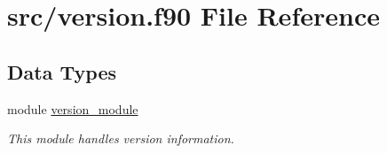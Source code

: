 \hypertarget{version_8f90}{\section{src/version.f90 File Reference}
\label{version_8f90}
}
\subsection*{Data Types}
\begin{DoxyCompactItemize}
\item 
module \hyperlink{classversion__module}{version\-\_\-module}
\begin{DoxyCompactList}\small\item\em This module handles version information. \end{DoxyCompactList}\end{DoxyCompactItemize}
